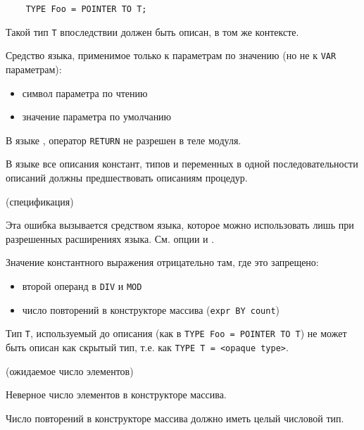 \verb'    TYPE Foo = POINTER TO T;'

Такой тип \verb'T' впоследствии должен быть описан, в том же контексте.


Средство языка, применимое только к параметрам по значению
(но не к \verb'VAR' параметрам):

\begin{itemize}
\item символ параметра по чтению
\item значение параметра по умолчанию
\end{itemize}


В языке \ot{}, оператор \verb'RETURN' не разрешен в теле модуля.


В языке \ot{} все описания констант, типов и переменных в 
одной последовательности описаний должны предшествовать
описаниям процедур.

(спецификация)

Эта ошибка вызывается средством языка, которое можно использовать
лишь при разрешенных расширениях языка.
См. опции  и .


Значение константного выражения отрицательно там, где это запрещено:
\begin{itemize}
\item второй операнд в \verb'DIV' и \verb'MOD'
\item число повторений в конструкторе массива (\verb'expr BY count')
\end{itemize}


Тип \verb'T', используемый до описания 
(как в \verb'TYPE Foo = POINTER TO T') не может быть описан как
скрытый тип, т.е. как \verb'TYPE T = <opaque type>'.

(ожидаемое число элементов)

Неверное число элементов в конструкторе массива.


Число повторений в конструкторе массива должно иметь целый числовой тип.

